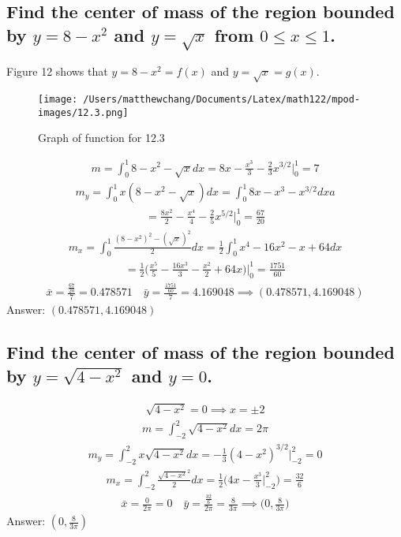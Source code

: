 \documentclass{article}
\begin{document}
\subsection{Find the center of mass of the region bounded by $y = 8 - x^2$ and $y = \sqrt{x}$ from $0 \leq x \leq 1$.}
Figure 12 shows that $y = 8 - x^2 = f(x)$ and $y = \sqrt{x} = g(x)$. 
\begin{figure}
	\centering
	\texttt{[image: /Users/matthewchang/Documents/Latex/math122/mpod-images/12.3.png]}
	\caption{Graph of function for 12.3}
\end{figure}
\begin{align*}
	m = \int_0^1 {8 - x^2 - \sqrt{x}dx} = 8x - \frac{x^3}{3} - \frac{2}{3}x^{3/2} \bigg|_0^1 = 7
\end{align*}
\begin{align*}
	m_y = \int_0^1 {x(8 - x^2 - \sqrt{x})dx} = \int_0^1 {8x - x^3 - x^{3/2}dx}a
\end{align*}
\begin{align*}
	= \frac{8x^2}{2} - \frac{x^4}{4} - \frac{2}{5}x^{5/2} \bigg|_0^1 = \frac{67}{20}
\end{align*}
\begin{align*}
	m_x = \int_0^1 {\frac{(8 - x^2)^2 - (\sqrt{x})^2}{2}dx} = \frac{1}{2}\int_0^1 {x^4 - 16x^2 - x + 64 dx}
\end{align*}
\begin{align*}
	= \frac{1}{2} \bigg( \frac{x^5}{5} - \frac{16x^3}{3} - \frac{x^2}{2} + 64x \bigg) \bigg|_0^1 = \frac{1751}{60}
\end{align*}
\begin{align*}
	\bar{x} = \frac{\frac{67}{20}}{7} = 0.478571 \quad \bar{y} = \frac{\frac{1751}{60}}{7} = 4.169048 \implies (0.478571, 4.169048)
\end{align*}
Answer: $(0.478571, 4.169048)$

\subsection{Find the center of mass of the region bounded by $y = \sqrt{4 - x^2}$ and $y = 0$.}
\begin{align*}
	\sqrt{4 - x^2} = 0 \implies x = \pm 2
\end{align*}
\begin{align*}
	m = \int_{-2}^2 {\sqrt{4 - x^2}dx} = 2\pi
\end{align*}
\begin{align*}
	m_y = \int_{-2}^2 {x\sqrt{4 - x^2}dx} = -\frac{1}{3} (4 - x^2)^{3/2} \bigg|_{-2}^2 = 0
\end{align*}
\begin{align*}
	m_x = \int_{-2}^2 {\frac{\sqrt{4 - x^2}^2}{2}dx} = \frac{1}{2} \bigg( 4x - \frac{x^3}{3} \bigg|_{-2}^2 \bigg) = \frac{32}{6}
\end{align*}
\begin{align*}
	\bar{x} = \frac{0}{2\pi} = 0 \quad \bar{y} = \frac{\frac{32}{6}}{2\pi} = \frac{8}{3\pi} \implies \bigg( 0, \frac{8}{3\pi} \bigg)
\end{align*}
Answer: $(0, \frac{8}{3\pi})$
\end{document}
